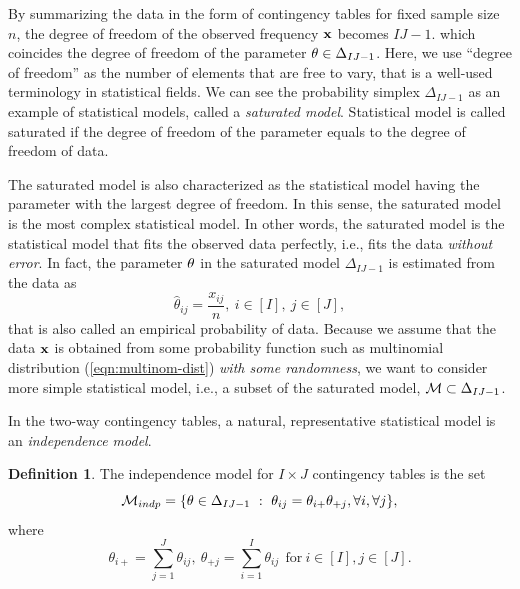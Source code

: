 \documentclass[12pt]{article}
\theoremstyle{definition}
\newtheorem{Definition}[Theorem]{Definition}
\def\Bx{{\bf x}}
\def\Btheta{{\bf \theta}}
\begin{document}
By summarizing the data in the form of contingency tables for fixed
sample size $n$, 
the degree of freedom of the observed frequency $\Bx$
 becomes $IJ - 1$. which coincides the degree of freedom of
the parameter $\Btheta \in \Delta_{IJ-1}$. Here, we use 
``degree of freedom'' as the number of elements that are free to vary, 
that is a well-used terminology in statistical fields.  
We can see 
the probability simplex $\Delta_{IJ-1}$ as an example of 
statistical models, called a {\it saturated model}. 
Statistical model is called saturated if the degree of freedom of the
      parameter equals to the degree of freedom of data.

The saturated model is also characterized as the statistical model having the
 parameter with the largest degree of freedom.  
In this sense, the saturated model is the most complex statistical model. 
In other words, the saturated model is the statistical model that fits
 the observed data perfectly, i.e., fits the data {\it without error}. 
In fact, the
 parameter $\Btheta$ in the saturated model $\Delta_{IJ-1}$ is estimated
 from the data as
\begin{equation}
 \hat{\theta}_{ij} = \frac{x_{ij}}{n},\ i \in [I],\ j \in [J],
\label{eqn:empirical-2-way}
\end{equation}
that is also called an empirical probability of data. Because we
assume that 
the data $\Bx$ is obtained from some probability function such as
multinomial distribution (\ref{eqn:multinom-dist}) {\it with some randomness},
we want to consider more simple statistical model, i.e., a subset of the
saturated model,  
${\cal M} \subset \Delta_{IJ - 1}$.

In the two-way contingency tables, a natural, representative statistical
model is an {\it independence model}. 
\begin{Definition}
The independence model for $I\times J$ contingency tables is the set
\begin{equation}
 {\cal M}_{indp} = \{\Btheta \in \Delta_{IJ-1}\ :\ \theta_{ij} =
 \theta_{i+}\theta_{+j}, \forall i, \forall j\},
\label{eqn:indep-model}
\end{equation}
where
\[
 \theta_{i+} = \sum_{j = 1}^J\theta_{ij},\ 
 \theta_{+j} = \sum_{i = 1}^I\theta_{ij}\ \ \mbox{for}\ i \in [I], j \in [J].
\]
\end{Definition}
\end{document}
